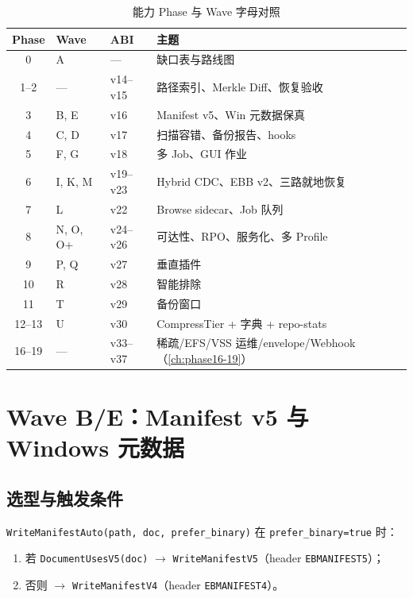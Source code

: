 \begin{table}[htbp]
\centering
\caption{能力 Phase 与 Wave 字母对照}
\small
\begin{tabular}{@{}clll@{}}
\toprule
Phase & Wave & ABI & 主题 \\
\midrule
0 & A & — & 缺口表与路线图 \\
1--2 & — & v14--v15 & 路径索引、Merkle Diff、恢复验收 \\
3 & B, E & v16 & Manifest v5、Win 元数据保真 \\
4 & C, D & v17 & 扫描容错、备份报告、hooks \\
5 & F, G & v18 & 多 Job、GUI 作业 \\
6 & I, K, M & v19--v23 & Hybrid CDC、EBB v2、三路就地恢复 \\
7 & L & v22 & Browse sidecar、Job 队列 \\
8 & N, O, O+ & v24--v26 & 可达性、RPO、服务化、多 Profile \\
9 & P, Q & v27 & 垂直插件 \\
10 & R & v28 & 智能排除 \\
11 & T & v29 & 备份窗口 \\
12--13 & U & v30 & CompressTier + 字典 + repo-stats \\
16--19 & — & v33--v37 & 稀疏/EFS/VSS 运维/envelope/Webhook（\cref{ch:phase16-19}） \\
\bottomrule
\end{tabular}
\end{table}

\section{Wave B/E：Manifest v5 与 Windows 元数据}
\label{sec:cap-manifest-v5}

\subsection{选型与触发条件}

\texttt{WriteManifestAuto(path, doc, prefer\_binary)} 在 \texttt{prefer\_binary=true} 时：
\begin{enumerate}[nosep]
  \item 若 \texttt{DocumentUsesV5(doc)} $\rightarrow$ \texttt{WriteManifestV5}（header \texttt{EBMANIFEST5}）；
  \item 否则 $\rightarrow$ \texttt{WriteManifestV4}（header \texttt{EBMANIFEST4}）。
\end{enumerate}

